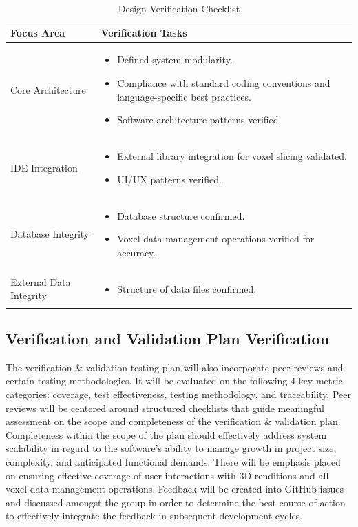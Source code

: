 \documentclass[12pt, titlepage]{article}
\begin{document}
\begin{table}[H]
\centering
\caption{Design Verification Checklist}
\label{tab:des}
\renewcommand{\arraystretch}{1.3}
\setlength{\tabcolsep}{8pt}
\begin{tabular}{|p{}|p{}|}
\hline
\textbf{Focus Area} & \textbf{Verification Tasks} \\ \hline
Core Architecture &
\begin{itemize}
\item Defined system modularity.
\item Compliance with standard coding conventions and language-specific best practices.
\item Software architecture patterns verified.
\end{itemize} \\ \hline
IDE Integration &
\begin{itemize}
\item External library integration for voxel slicing validated.
\item UI/UX patterns verified.
\end{itemize} \\ \hline
Database Integrity &
\begin{itemize}
\item Database structure confirmed.
\item Voxel data management operations verified for accuracy.
\end{itemize} \\ \hline
External Data Integrity &
\begin{itemize}
\item Structure of data files confirmed.
\end{itemize} \\ \hline
\end{tabular}
\end{table}


\subsection{Verification and Validation Plan Verification}

\noindent The verification \& validation testing plan will also incorporate peer reviews and certain testing methodologies. It will be evaluated on the following 4 key metric categories: coverage, test effectiveness, testing methodology, and traceability. Peer reviews will be centered around structured checklists that guide meaningful assessment on the scope and completeness of the verification \& validation plan. Completeness within the scope of the plan should effectively address system scalability in regard to the software’s ability to manage growth in project size, complexity, and anticipated functional demands. There will be emphasis placed on ensuring effective coverage of user interactions with 3D renditions and all voxel data management operations. Feedback will be created into GitHub issues and discussed amongst the group in order to determine the best course of action to effectively integrate the feedback in subsequent development cycles.\\
\end{document}

